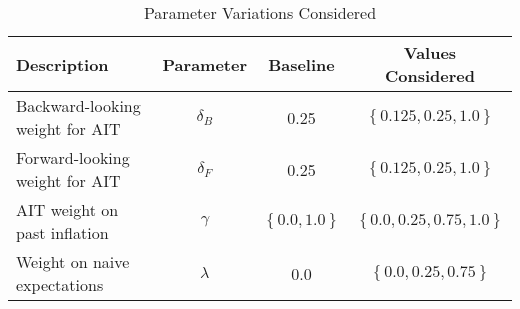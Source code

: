 \documentclass[12pt]{article}
\begin{document}
\begin{table}\caption{Parameter Variations Considered}\label{tb:parmsvary}
  \begin{center}
    \begin{tabular}{lccc}
      Description & Parameter & Baseline & Values Considered \\ \hline
      Backward-looking weight for AIT & $\delta_B$ & 0.25 & $\left\{0.125, 0.25, 1.0 \right\}$ \\  [0.25pc]
      Forward-looking weight for AIT & $\delta_F$ & 0.25 & $\left\{0.125, 0.25, 1.0 \right\}$ \\  [0.25pc]
      AIT weight on past inflation & $\gamma$ & $\left\{ 0.0, 1.0 \right\}$ & $\left\{ 0.0, 0.25, 0.75, 1.0\right\}$ \\  [0.25pc]
      Weight on naive expectations & $\lambda$ & 0.0 & $\left\{ 0.0, 0.25, 0.75 \right\}$ \\ [0.25pc]
      \hline
    \end{tabular}
  \end{center}
\end{table}
\end{document}
